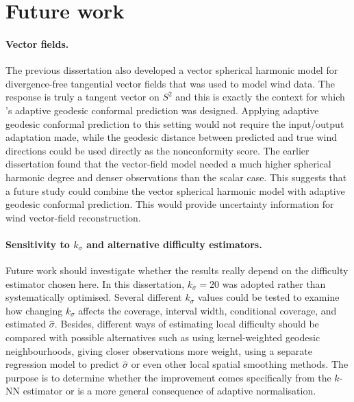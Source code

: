 \section{Future work}

\paragraph{Vector fields.} The previous dissertation also developed a vector spherical harmonic model for divergence-free tangential vector fields that was used to model wind data. The response is truly a tangent vector on $S^2$ and this is exactly the context for which \citeauthor{amirishahbazi2026}'s adaptive geodesic conformal prediction was designed. Applying adaptive geodesic conformal prediction to this setting would not require the input/output adaptation made, while the geodesic distance between predicted and true wind directions could be used directly as the nonconformity score. The earlier dissertation found that the vector-field model needed a much higher spherical harmonic degree and denser observations than the scalar case. This suggests that a future study could combine the vector spherical harmonic model with adaptive geodesic conformal prediction. This would provide uncertainty information for wind vector-field reconstruction. 
 
\paragraph{Sensitivity to $k_\sigma$ and alternative difficulty estimators.} Future work should investigate whether the results really depend on the difficulty estimator chosen here. In this dissertation, $k_\sigma=20$ was adopted rather than systematically optimised. Several different $k_\sigma$ values could be tested to examine how changing $k_\sigma$ affects the coverage, interval width, conditional coverage, and estimated $\hat\sigma$. Besides, different ways of estimating local difficulty should be compared with possible alternatives such as using kernel-weighted geodesic neighbourhoods, giving closer observations more weight, using  a separate regression model to predict  $\hat\sigma$ or even other local spatial smoothing methods. The purpose is to determine whether the improvement comes specifically from the $k$-NN estimator or is a more general consequence of adaptive normalisation.

